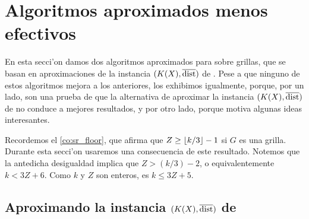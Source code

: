 %
%

\section{Algoritmos aproximados menos efectivos}

En esta secci'on damos dos algoritmos aproximados para  sobre grillas, que se basan en aproximaciones de la instancia $(K(X), \overline{\textnormal{dist}})$ de . Pese a que ninguno de estos algoritmos mejora a los anteriores, los exhibimos igualmente, porque, por un lado, son una prueba de que la alternativa de aproximar la instancia $(K(X), \overline{\textnormal{dist}})$ de  no conduce a mejores resultados, y por otro lado, porque motiva algunas ideas interesantes.

Recordemos el \autoref{co:sr_floor}, que afirma que $Z \geq \left\lfloor k / 3 \right\rfloor - 1$ si $G$ es una grilla. Durante esta secci'on usaremos una consecuencia de este resultado. Notemos que la antedicha desigualdad implica que $Z > (k / 3) - 2$, o equivalentemente $k < 3Z + 6$. Como $k$ y $Z$ son enteros, es $k \leq 3Z + 5$.

\subsection{Aproximando la instancia $(K(X), \overline{\textnormal{dist}})$ de }

